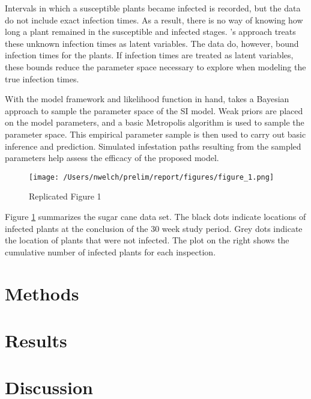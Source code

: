 \documentclass{uwstat572}
\begin{document}
Intervals in which a susceptible plants became infected is recorded, but the data do not include exact infection times.  
As a result, there is no way of knowing how long a plant remained in the susceptible and infected stages.
\cite{Brown}'s approach treats these unknown infection times as latent variables.
The data do, however, bound infection times for the plants.
If infection times are treated as latent variables, these bounds reduce the parameter space necessary to explore when modeling the true infection times. 

With the model framework and likelihood function in hand, \cite{Brown} takes a Bayesian approach to sample the parameter space of the SI model. 
Weak priors are placed on the model parameters, and a basic Metropolis algorithm is used to sample the parameter space. 
This empirical parameter sample is then used to carry out basic inference and prediction. 
Simulated infestation paths resulting from the sampled parameters help assess the efficacy of the proposed model. 

\begin{figure}[H]
\centering
\texttt{[image: /Users/nwelch/prelim/report/figures/figure\_1.png]}
\caption{Replicated Figure 1}
   \label{fig:data_plot}
\end{figure}

Figure \ref{fig:data_plot} summarizes the sugar cane data set. The black dots indicate locations of infected plants at the conclusion of the 30 week study period. Grey dots indicate the location of plants that were not infected. The plot on the right shows the cumulative number of infected plants for each inspection. 

\section{Methods}

\section{Results}

\section{Discussion}


\end{document}
